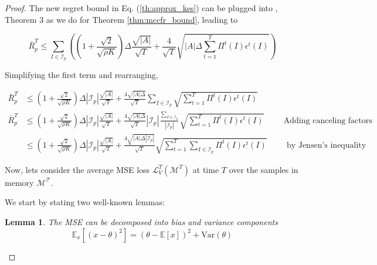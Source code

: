 \documentclass{article}
\newtheorem{lemma}{Lemma}
\begin{document}
\begin{proof}
\vspace{0.5cm}

The new regret bound in Eq. (\ref{th:approx_kes}) can be plugged into \citealt{lanctot2013monte}, Theorem 3 as we do for Theorem \ref{thm:mccfr_bound}, leading to 

\begin{equation}
    \label{eq:deepcfr_approx}
    \bar{R}_p^T \leq \sum_{I \in \mathcal{I}_p} \left(
    \left( 1 + \frac{\sqrt{2}}{\sqrt{\rho K}} \right)
    \Delta \frac{\sqrt{|A|}}{\sqrt{T}}  + 
    \frac{4}{\sqrt{T}} \sqrt{|A| \Delta \sum_{t=1}^T \Pi^t(I) \epsilon^t(I) } \right)
\end{equation}

Simplifying the first term and rearranging, 

\begin{align}
\label{eq:regret_pi_epsilon}
    \bar{R}_p^T & \leq \left( 1 + \frac{\sqrt{2}}{\sqrt{\rho K}} \right) \Delta |\mathcal{I}_p| \frac{\sqrt{|A|}}{\sqrt{T}} +  \frac{4\sqrt{|A| \Delta}}{\sqrt{T}} \sum_{I \in \mathcal{I}_p}  \sqrt{ \sum_{t=1}^T \Pi^t(I) \epsilon^t(I) } \\
    \bar{R}_p^T & \leq \left( 1 + \frac{\sqrt{2}}{\sqrt{\rho K}} \right) \Delta |\mathcal{I}_p| \frac{\sqrt{|A|}}{\sqrt{T}} +  \frac{4\sqrt{|A| \Delta}}{\sqrt{T}} |\mathcal{I}_p| \frac{\sum_{I \in \mathcal{I}_p}}{|\mathcal{I}_p|} \sqrt{ \sum_{t=1}^T \Pi^t(I) \epsilon^t(I) } \hspace{1cm} \textrm{Adding canceling factors}\\
   & \leq \left( 1 + \frac{\sqrt{2}}{\sqrt{\rho K}} \right) \Delta |\mathcal{I}_p| \frac{\sqrt{|A|}}{\sqrt{T}} +  \frac{4\sqrt{|A| \Delta |\mathcal{I}_p|}}{\sqrt{T}}  \sqrt{ \sum_{t=1}^T \sum_{I \in \mathcal{I}_p}  \Pi^t(I) \epsilon^t(I) } \hspace{1cm} \textrm{by Jensen's inequality}
\end{align}

Now, lets consider the average MSE loss $\mathcal{L}_V^T(\mathcal{M}^T)$ at time $T$ over the samples in memory $\mathcal{M^T}$.

We start by stating two well-known lemmas:
\begin{lemma} The MSE can be decomposed into bias and variance components
\label{lemma:mse1}
\begin{equation}
\mathbb{E}_x[(x - \theta)^2] = (\theta - \mathbb{E}[x])^2 + \mathrm{Var}(\theta)
\end{equation}
\end{lemma}


\end{proof}
\end{document}

